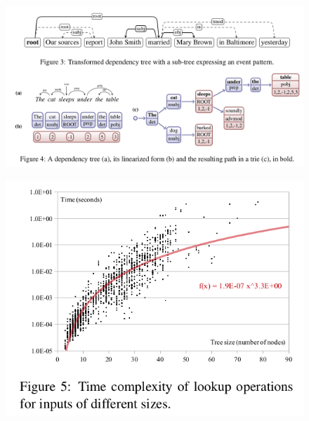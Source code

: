 \documentclass[xcolor={table}]{beamer}
\begin{document}
\begin{frame}{\cite{pighin2014modelling}}
\begin{figure}[h]
\centering
\includegraphics[scale=.25]{images/figure4-pighin14} \\
\end{figure}
\end{frame}

\begin{frame}{\cite{pighin2014modelling}}
\begin{figure}[h]
\centering
\includegraphics[scale=.25]{images/figure5-pighin14} \\
\end{figure}
\end{frame}
\end{document}
